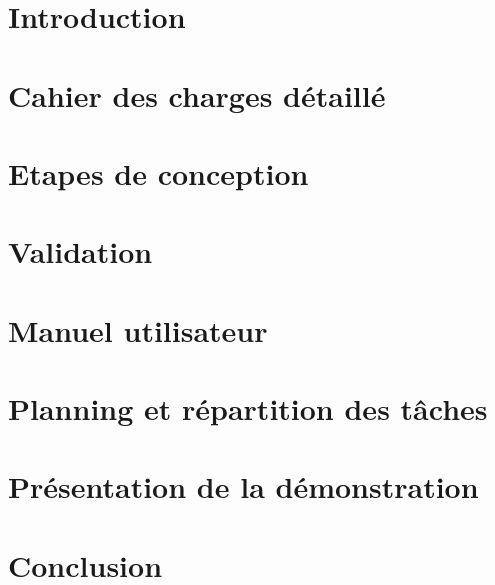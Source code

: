 
\section{Introduction}


\section{Cahier des charges détaillé}


\section{Etapes de conception}


\section{Validation}


\section{Manuel utilisateur}


\section{Planning et répartition des tâches}


\section{Présentation de la démonstration}


\section{Conclusion}


\pagebreak


\pagebreak




\pagebreak
\printnomenclature
